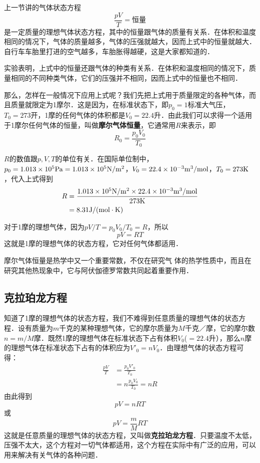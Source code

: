 上一节讲的气体状态方程
\[\frac{pV}{T}=\text{恒量} \]
是一定质量的理想气体状态方程，其中的恒量跟气体的质量有关系．在体积和温度相同的情况下，气体的质量越多，气体的压强就越大，因而上式中的恒量就越大．自行车车胎里打进的空气越多，车胎胀得越硬，这是大家都知道的．

实验表明，上式中的恒量还跟气体的种类有关系．在体积和温度相同的情况下，质量相同的不同种类气体，它们的压强并不相同，因而上式中的恒量也不相同．

那么，怎样在一般情况下应用上式呢？我们先把上式用于质量限定的各种气体，而且质量就限定为1摩尔．这是因为，在标准状态下，即$p_0=1$标准大气压，$T_0=273$开，1摩的任何气体的体积都是$V_0=22.4$升．由此我们可以求得一个适用于1摩尔任何气体的恒量，叫做\textbf{摩尔气体恒量}，它通常用$R$来表示，即
\[R_0=\frac{p_0V_0}{T_0} \]

$R$的数值跟$p,V,T$的单位有关．在国际单位制中，$p_0=
1.013\times 10^5{\rm Pa}=1.013\times 10^5{\rm N}/{\rm m^2}$，$V_0=22. 4\times 10^{-3}{\rm m^3}/{\rm mol}$，$T_0=273{\rm K}$，代入上式得到
\[\begin{split}
R&=\frac{1.013\times 10^5{\rm N}/{\rm m^2}\times  22. 4\times 10^{-3}{\rm m^3}/{\rm mol}}{273{\rm K} }\\
&=8.31{\rm J}/({\rm mol\cdot K})
\end{split} \]

对于1摩的理想气体，因为$pV/T=p_0V_0/T_0=R$，所以
$$pV=RT$$
这就是1摩的理想气体的状态方程，它对任何气体都适用．

摩尔气体恒量是热学中又一个重要常数，不仅在研究气
体的热学性质中，而且在研究其他热现象中，它与阿伏伽德罗常数共同起着重要作用．

\subsection{克拉珀龙方程} 

知道了1摩的理想气体的状态方程，我们不难得到任意质量的理想气体的状态方程．设有质量为$m$千克的某种理想气体，它的摩尔质量为$M$千克／摩，它的摩尔数$n=m/M$摩．既然1摩的理想气体在标准状态下占有体积$V_0$($=22.4$升），那么$n$摩的理想气体在标准状态下占有的体积应为$V'_0=nV_0$．由理想气体的状态方程可得：
\[\begin{split}
\frac{pV}{T}&=\frac{p_0V'_0}{T_0}\\
&=n\frac{p_0V_0}{T_0}=nR
\end{split} \]
由此得到
\[pV=nRT \]
或\[pV=\frac{m}{M}RT \]
这就是任意质量的理想气体的状态方程，又叫做\textbf{克拉珀龙方程}．只要温度不太低，压强不太大，这个方程对一切气体都适用，这个方程在实际中有广泛的应用，可以用来解决有关气体的各种问题．


